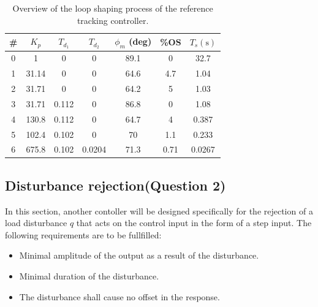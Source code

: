 \begin{table}[ht]
    \centering
    \caption{Overview of the loop shaping process of the reference tracking controller.}
    \label{tab:loopshaping1}
    \begin{tabular}{ccccccc}
        \toprule
            \# & $K_p$ & $T_{d_1}$ & $T_{d_2}$ & $\phi_m$ (deg) & \%OS & $T_s (\si{\second})$ \\
        \midrule
            0 & 1 & 0 & 0 & 89.1 &  0 & 32.7\\ 
            1 & 31.14 &        0 &        0 &  64.6 &   4.7 &  1.04\\ 
            2 & 31.71 &        0 &        0 &  64.2 &     5 &  1.03\\ 
            3 & 31.71 &    0.112 &        0 &  86.8 &     0 &  1.08\\ 
            4 & 130.8 &    0.112 &        0 &  64.7 &     4 & 0.387\\ 
            5 & 102.4 &    0.102 &        0 &    70 &   1.1 & 0.233\\ 
            6 & 675.8 &    0.102 &   0.0204 &  71.3 &  0.71 & 0.0267\\ 
        \bottomrule
    \end{tabular}
\end{table}

\subsection{Disturbance rejection\textnormal{\phantom{xxx}(Question 2)}}
\label{sec:continuousdisturbance}
In this section, another contoller will be designed specifically for the rejection of a load disturbance $q$ that acts on the control input in the form of a step input. The following requirements are to be fullfilled:
\begin{itemize}
    \item Minimal amplitude of the output as a result of the disturbance.
    \item Minimal duration of the disturbance.
    \item The disturbance shall cause no offset in the response.
\end{itemize}
